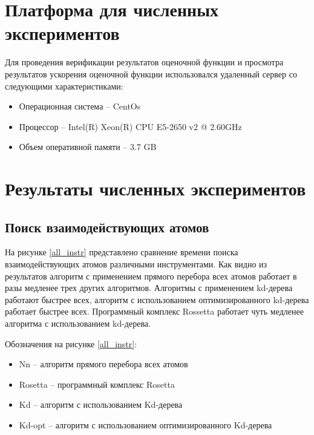 \section{Платформа для численных экспериментов}


Для проведения верификации результатов оценочной функции и просмотра результатов ускорения оценочной функции использовался удаленный сервер со следующими характеристиками: 

\begin{itemize}
	\item Операционная система -- CentOs
	\item Процессор -- Intel(R) Xeon(R) CPU E5-2650 v2 @ 2.60GHz
	\item Объем оперативной памяти -- 3.7 GB
\end{itemize}


\section{Результаты численных экспериментов}

\subsection{Поиск взаимодействующих атомов}


На рисунке \ref{all_instr} представлено сравнение времени поиска взаимодействующих атомов различными инструментами. Как видно из результатов алгоритм с применением прямого перебора всех атомов работает в разы медленее трех других алгоритмов. Алгоритмы с применением kd-дерева работают быстрее всех, алгоритм с использованием оптимизированного kd-дерева работает быстрее всех. Программный комплекс Rossetta работает чуть медленее алгоритма с использованием kd-дерева.

Обозначения на рисунке \ref{all_instr}:
\begin{itemize}
	\item Nn -- алгоритм прямого перебора всех атомов
	\item Rosetta -- программный комплекс Rosetta
	\item Kd -- алгоритм с использованием Kd-дерева
	\item Kd-opt -- алгоритм с использованием оптимизированного Kd-дерева
\end{itemize}

